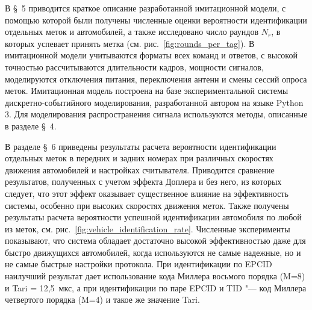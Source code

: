 
В \S~5 приводится краткое описание разработанной имитационной модели, с помощью которой были получены численные оценки вероятности идентификации отдельных меток и автомобилей, а также исследовано число раундов $N_r$, в которых успевает принять метка (см. рис.~\ref{fig:rounds_per_tag}). В имитационной модели учитываются форматы всех команд и ответов, с высокой точностью рассчитываются длительности кадров, мощности сигналов, моделируются отключения питания, переключения антенн и смены сессий опроса меток. Имитационная модель построена на базе экспериментальной системы дискретно-событийного моделирования, разработанной автором на языке Python 3. Для моделирования распространения сигнала используются методы, описанные в разделе \S~4.


В разделе \S~6 приведены результаты расчета вероятности идентификации отдельных меток в передних и задних номерах при различных скоростях движения автомобилей и настройках считывателя. Приводится сравнение результатов, полученных с учетом эффекта Доплера и без него, из которых следует, что этот эффект оказывает существенное влияние на эффективность системы, особенно при высоких скоростях движения меток. Также получены результаты расчета вероятности успешной идентификации автомобиля по любой из меток, см. рис.~\ref{fig:vehicle_identification_rate}. Численные эксперименты показывают, что система обладает достаточно высокой эффективностью даже для быстро движущихся автомобилей, когда используются не самые надежные, но и не самые быстрые настройки протокола. При идентификации по EPCID наилучший результат дает использование кода Миллера восьмого порядка (M=8) и Tari = 12,5~мкс, а при идентификации по паре EPCID и TID "--- код Миллера четвертого порядка (M=4) и такое же значение Tari.




